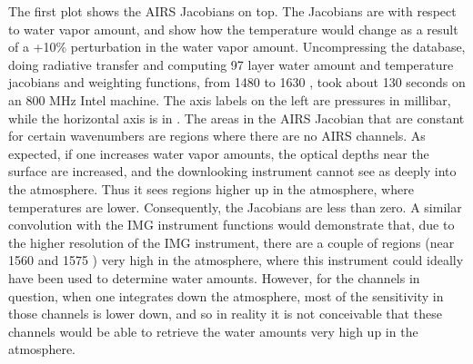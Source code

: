 \documentclass[11pt]{article}
\begin{document}

The first plot shows the AIRS Jacobians on top. The Jacobians are with 
respect to water vapor amount, and show how the temperature would change as a 
result of a +10\%
perturbation in the water vapor amount. Uncompressing the database, doing 
radiative transfer and computing 97 layer water amount and temperature 
jacobians and weighting functions, from 1480 \wn to 1630 \wn, took about 
130 seconds on an 800 MHz Intel machine. The axis labels on the left
are pressures in millibar, while the horizontal axis is in \wn. The
areas in the AIRS Jacobian that are constant for certain wavenumbers
are regions where there are no AIRS channels.  As expected, if one
increases water vapor amounts, the optical depths near the surface are
increased, and the downlooking instrument cannot see as deeply into
the atmosphere. Thus it sees regions higher up in the atmosphere,
where temperatures are lower. Consequently, the Jacobians are less
than zero.  A similar convolution with the IMG instrument functions would 
demonstrate that, due to the higher resolution of the IMG instrument,
there are a couple of regions (near 1560 \wn and 1575 \wn) very high
in the atmosphere, where this instrument could ideally have been used
to determine water amounts. However, for the channels in question,
when one integrates down the atmosphere, most of the sensitivity in
those channels is lower down, and so in reality it is not conceivable
that these channels would be able to retrieve the water amounts very
high up in the atmosphere.

\end{document}
